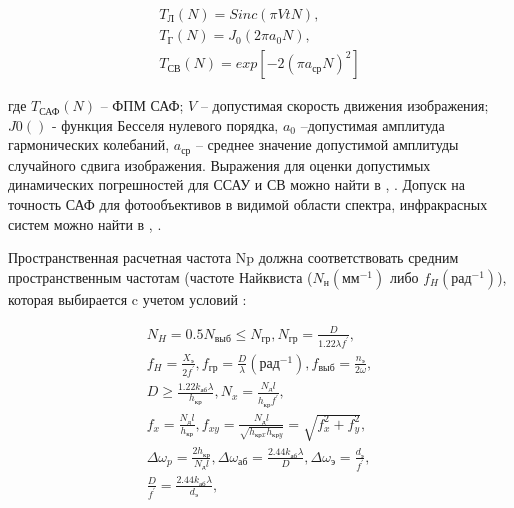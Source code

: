 \begin{equation}
\label{eq:p2:7}
\begin{alignedat}{3}
T_\textit{Л}\left(N\right)=Sinc(\pi{}VtN) , \\
T_{\textit{Г}}(N)=J_0\left(2\pi{}a_0N\right) , \\
T_{\textit{СВ}}\left(N\right) = exp[-2{(\pi{}a_{\textit{ср}}N)}^2]
\end{alignedat}
\end{equation}

где $T_{\textit{САФ}}(N)$ – ФПМ САФ; 
$V$ – допустимая скорость движения изображения; 
$J0()$ - функция Бесселя нулевого порядка, 
$a_0$ –допустимая амплитуда гармонических колебаний, 
$a_{\textit{ср}}$ – среднее значение допустимой амплитуды случайного сдвига изображения. 
Выражения для оценки допустимых динамических погрешностей для ССАУ и СВ можно найти в \cite[]{Karpov}, \cite[]{Karpov23}. Допуск на точность САФ для фотообъективов в видимой области спектра, инфракрасных систем можно найти в \cite[]{Tarasov}, \cite[]{Belyakov}.

Пространственная расчетная частота Np должна соответствовать средним пространственным частотам (частоте Найквиста ($N_{\textit{н}} (\textit{мм}^{-1})$ либо $f_H (\textit{рад}^{-1})$), которая выбирается c учетом условий \cite[]{Tarasov}: 

\begin{equation}
\label{eq:p2:8}
\begin{alignedat}{2}
N_H=0.5 N_{\textit{выб}}\leq{}N_{\textit{гр}},
N_{\textit{гр}}=\frac{D}{1.22\lambda{}f^{'}},\\
f_H=\frac{X_\textit{э}}{2f^{'}},
f_{\textit{гр}}=\frac{D}{\lambda{}}(\textit{рад}^{-1}),
f_{\textit{выб}}=\frac{n_{\textit{э}}}{2\omega{}},\\
D\geq{}\frac{1.22 k_{\textit{аб}}\lambda{}}{h_{\textit{кр}}},
N_x=\frac{N_{\textit{д}}l}{h_{\textit{кр}}f^{'}},\\
f_x=\frac{N_{\textit{д}}l}{h_{\textit{кр}}},
f_{xy}=\frac{N_{\textit{д}}l}{\sqrt{h_{\textit{крx}}h_{\textit{крy}}}}=\sqrt{f_x^2+f_y^2},\\
\Delta{}{\omega{}}_p=\frac{2h_{\textit{кр}}}{N_{\textit{д}}l},
\Delta{}{\omega{}}_{\textit{аб}} =\frac{2.44 k_{\textit{аб}}\lambda{}}{D},
\Delta{}{\omega{}}_{\textit{э}} =\frac{d_{\textit{э}}}{f^{'}},\\
\frac{D}{f^{'}}=\frac{2.44 k_{\textit{аб}}\lambda{}}{d_{\textit{э}}},\\
\end{alignedat}
\end{equation}

